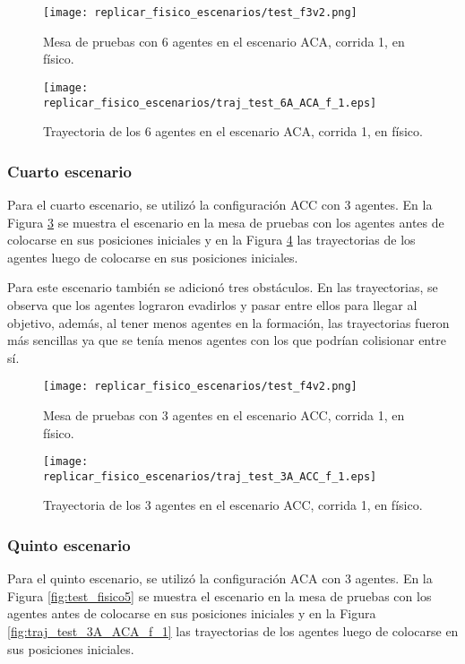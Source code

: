 \begin{figure}[H]
	\centering
	\texttt{[image: replicar\_fisico\_escenarios/test\_f3v2.png]}
	\caption{Mesa de pruebas con 6 agentes en el escenario ACA, corrida 1, en físico.}
	\label{fig:test_fisico3}
\end{figure}
\begin{figure}[H]
	\centering
	\texttt{[image: replicar\_fisico\_escenarios/traj\_test\_6A\_ACA\_f\_1.eps]}
	\caption{Trayectoria de los 6 agentes en el escenario ACA, corrida 1, en físico.}
	\label{fig:traj_test_6A_ACA_f_1}
\end{figure}

\subsubsection{Cuarto escenario}
Para el cuarto escenario, se utilizó la configuración ACC con 3 agentes. En la Figura \ref{fig:test_fisico4} se muestra el escenario en la mesa de pruebas con los agentes antes de colocarse en sus posiciones iniciales y en la Figura \ref{fig:traj_test_3A_ACC_f_1} las trayectorias de los agentes luego de colocarse en sus posiciones iniciales.

Para este escenario también se adicionó tres obstáculos. En las trayectorias, se observa que los agentes lograron evadirlos y pasar entre ellos para llegar al objetivo, además, al tener menos agentes en la formación, las trayectorias fueron más sencillas ya que se tenía menos agentes con los que podrían colisionar entre sí.

\begin{figure}[H]
	\centering
	\texttt{[image: replicar\_fisico\_escenarios/test\_f4v2.png]}
	\caption{Mesa de pruebas con 3 agentes en el escenario ACC, corrida 1, en físico.}
	\label{fig:test_fisico4}
\end{figure}
\begin{figure}[H]
	\centering
	\texttt{[image: replicar\_fisico\_escenarios/traj\_test\_3A\_ACC\_f\_1.eps]}
	\caption{Trayectoria de los 3 agentes en el escenario ACC, corrida 1, en físico.}
	\label{fig:traj_test_3A_ACC_f_1}
\end{figure}

\subsubsection{Quinto escenario}
Para el quinto escenario, se utilizó la configuración ACA con 3 agentes. En la Figura \ref{fig:test_fisico5} se muestra el escenario en la mesa de pruebas con los agentes antes de colocarse en sus posiciones iniciales y en la Figura \ref{fig:traj_test_3A_ACA_f_1} las trayectorias de los agentes luego de colocarse en sus posiciones iniciales.

